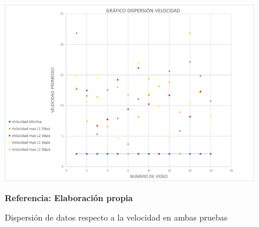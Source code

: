 \documentclass[12pt,twocolumn,a4paper]{article}
\begin{document}
\begin{figure}[h!]

	\centering
	\includegraphics[scale=0.6]{Dispvel.png}
	\caption{Dispersión de datos respecto a la velocidad en ambas pruebas } \textbf{Referencia: Elaboración propia} 
	\label{dispvel}
\end{figure}
\end{document}
